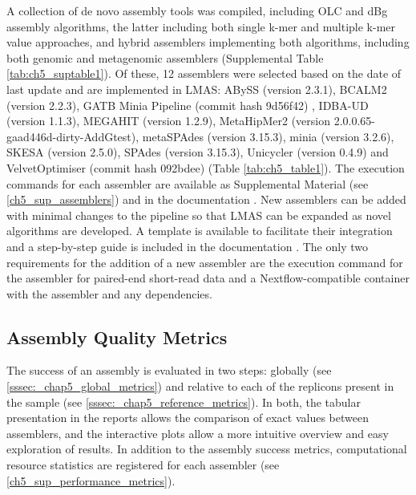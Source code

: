 A collection of de novo assembly tools was compiled, including \ac{OLC} and \ac{dBg} assembly algorithms, the latter including both single k-mer and multiple k-mer value approaches, and hybrid assemblers implementing both algorithms, including both genomic and metagenomic assemblers (Supplemental Table \ref{tab:ch5_suptable1}). Of these, 12 assemblers were selected based on the date of last update and are implemented in LMAS: ABySS \cite{jackman_abyss_2017} (version 2.3.1), BCALM2 \cite{chikhi_compacting_2016} (version 2.2.3), GATB Minia Pipeline \cite{noauthor_gatbgatb-minia-pipeline_2022} (commit hash 9d56f42) , IDBA-UD \cite{peng_idba-ud_2012} (version 1.1.3), MEGAHIT \cite{li_megahit_2015} (version 1.2.9), MetaHipMer2 \cite{georganas_extreme_2018} (version 2.0.0.65-gaad446d-dirty-AddGtest), metaSPAdes \cite{nurk_metaspades_2017} (version 3.15.3), minia \cite{chikhi_space-efficient_2013} (version 3.2.6), SKESA \cite{souvorov_skesa_2018} (version 2.5.0), SPAdes \cite{bankevich_spades_2012} (version 3.15.3), Unicycler \cite{wick_unicycler_2017} (version 0.4.9) and VelvetOptimiser \cite{seemann_velvetoptimiser_2021} (commit hash 092bdee) (Table \ref{tab:ch5_table1}). The execution commands for each assembler are available as Supplemental Material (see \ref{ch5_sup_assemblers}) and in the documentation \cite{noauthor_short-read_nodate}. 
New assemblers can be added with minimal changes to the pipeline so that LMAS can be expanded as novel algorithms are developed. A template is available to facilitate their integration and a step-by-step guide is included in the documentation \cite{noauthor_add_nodate}. The only two requirements for the addition of a new assembler are the execution command for the assembler for paired-end short-read data and a Nextflow-compatible container with the assembler and any dependencies.



\subsection{Assembly Quality Metrics}

The success of an assembly is evaluated in two steps: globally (see \ref{sssec:_chap5_global_metrics}) and relative to each of the replicons present in the sample (see \ref{sssec:_chap5_reference_metrics}). In both, the tabular presentation in the reports allows the comparison of exact values between assemblers, and the interactive plots allow a more intuitive overview and easy exploration of results. In addition to the assembly success metrics, computational resource statistics are registered for each assembler (see \ref{ch5_sup_performance_metrics}).

